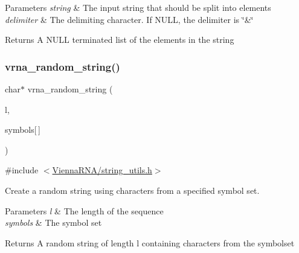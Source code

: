 \begin{DoxyParams}{Parameters}
{\em string} & The input string that should be split into elements \\
\hline
{\em delimiter} & The delimiting character. If {\ttfamily N\+U\+LL}, the delimiter is {\ttfamily \char`\"{}\&\char`\"{}} \\
\hline
\end{DoxyParams}
\begin{DoxyReturn}{Returns}
A {\ttfamily N\+U\+LL} terminated list of the elements in the string 
\end{DoxyReturn}
\mbox{\label{group__string__utils_ga4eeb3750dcf860b9f3158249f95dbd7f}} 
\subsubsection{\texorpdfstring{vrna\+\_\+random\+\_\+string()}{vrna\_random\_string()}}
{\footnotesize\ttfamily char$\ast$ vrna\+\_\+random\+\_\+string (\begin{DoxyParamCaption}\item[{int}]{l,  }\item[{const char}]{symbols\mbox{[}$\,$\mbox{]} }\end{DoxyParamCaption})}



{\ttfamily \#include $<$\mbox{\hyperlink{string__utils_8h}{Vienna\+R\+N\+A/string\+\_\+utils.\+h}}$>$}



Create a random string using characters from a specified symbol set. 


\begin{DoxyParams}{Parameters}
{\em l} & The length of the sequence \\
\hline
{\em symbols} & The symbol set \\
\hline
\end{DoxyParams}
\begin{DoxyReturn}{Returns}
A random string of length \textquotesingle{}l\textquotesingle{} containing characters from the symbolset 
\end{DoxyReturn}
\mbox{\label{group__string__utils_ga301798b43b6f66687985c725efd14f32}} 
